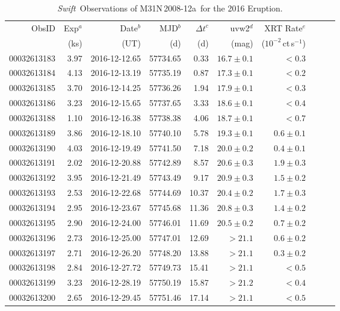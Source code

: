 \documentclass[twocolumn,tighten]{aastex6}
\def\swift{{\it Swift~}}
\def\novak{{M31N\,2008-12a}}
\newcommand{\power}[1]{$10^{#1}$}
\begin{document}
\begin{table*}
\caption{\swift Observations of \novak\ for the 2016 Eruption.}
\label{tab:swift}
\begin{center}
\begin{tabular}{rrrrrrrrrr}\hline\hline \noalign{\smallskip}
ObsID & Exp$^a$ & Date$^b$ & MJD$^b$ & $\Delta t^c$ & uvw2$^d$ & XRT Rate$^e$ \\
& (ks) & (UT) & (d) & (d) & (mag) & (\power{-2}\,ct\,s$^{-1}$)\\ \hline \noalign{\smallskip}
00032613183 & 3.97 & 2016-12-12.65 & 57734.65 & 0.33 & $16.7\pm0.1$ & $<0.3$ \\
00032613184 & 4.13 & 2016-12-13.19 & 57735.19 & 0.87 & $17.3\pm0.1$ & $<0.2$ \\
00032613185 & 3.70 & 2016-12-14.25 & 57736.26 & 1.94 & $17.9\pm0.1$ & $<0.3$ \\
00032613186 & 3.23 & 2016-12-15.65 & 57737.65 & 3.33 & $18.6\pm0.1$ & $<0.4$ \\
00032613188 & 1.10 & 2016-12-16.38 & 57738.38 & 4.06 & $18.7\pm0.1$ & $<0.7$ \\
00032613189 & 3.86 & 2016-12-18.10 & 57740.10 & 5.78 & $19.3\pm0.1$ & $0.6\pm0.1$ \\
00032613190 & 4.03 & 2016-12-19.49 & 57741.50 & 7.18 & $20.0\pm0.2$ & $0.4\pm0.1$ \\
00032613191 & 2.02 & 2016-12-20.88 & 57742.89 & 8.57 & $20.6\pm0.3$ & $1.9\pm0.3$ \\
00032613192 & 3.95 & 2016-12-21.49 & 57743.49 & 9.17 & $20.9\pm0.3$ & $1.5\pm0.2$ \\
00032613193 & 2.53 & 2016-12-22.68 & 57744.69 & 10.37 & $20.4\pm0.2$ & $1.7\pm0.3$ \\
00032613194 & 2.95 & 2016-12-23.67 & 57745.68 & 11.36 & $20.8\pm0.3$ & $1.4\pm0.2$ \\
00032613195 & 2.90 & 2016-12-24.00 & 57746.01 & 11.69 & $20.5\pm0.2$ & $0.7\pm0.2$ \\
00032613196 & 2.73 & 2016-12-25.00 & 57747.01 & 12.69 & $>21.1$ & $0.6\pm0.2$ \\
00032613197 & 2.71 & 2016-12-26.20 & 57748.20 & 13.88 & $>21.1$ & $0.3\pm0.2$ \\
00032613198 & 2.84 & 2016-12-27.72 & 57749.73 & 15.41 & $>21.1$ & $<0.5$ \\
00032613199 & 3.23 & 2016-12-28.19 & 57750.19 & 15.87 & $>21.2$ & $<0.4$ \\
00032613200 & 2.65 & 2016-12-29.45 & 57751.46 & 17.14 & $>21.1$ & $<0.5$ \\

\end{tabular}
\end{center}
\end{table*}
\end{document}
